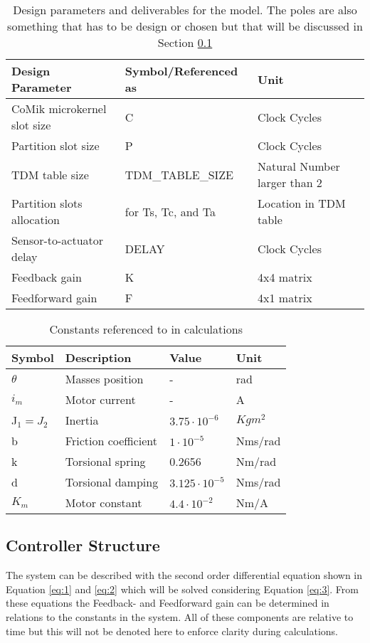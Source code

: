\begin{table}[h!]
	\centering
	\caption{Design parameters and deliverables for the model. The poles are also something that has to be design or chosen but that will be discussed in Section \ref{sec:controllerstructure}}
	\begin{tabular}{lll}
		\toprule
		Design Parameter & Symbol/Referenced as &Unit\\
		\midrule
		CoMik microkernel slot size& C & Clock Cycles \\
		Partition slot size& P & Clock Cycles\\
		TDM table size& TDM\_TABLE\_SIZE & Natural Number larger than 2\\
		Partition slots allocation	& for Ts, Tc, and Ta & Location in TDM table \\
		Sensor-to-actuator	delay& DELAY & Clock Cycles	\\
		Feedback gain& K & 4x4 matrix \\
		Feedforward gain& F & 4x1 matrix \\
		\midrule		
	\end{tabular}
	\label{tab:design}
\end{table}

\begin{table}[htbp]
	\centering
	\caption{Constants referenced to in calculations}
	\begin{tabular}{llll}
		\toprule
		Symbol & Description & Value & Unit\\ 
		\midrule
		$\theta$ & Masses position  & -&rad \\ 
		$i_m$ & Motor current  & - &A \\ 
		J$_1 = J_2$ & Inertia  & $3.75\cdot10^{-6}$&$Kgm^2$  \\ 
		b & Friction  coefficient   &$ 1\cdot10^{-5} $&Nms/rad\\ 
		k & Torsional spring  & 0.2656 &Nm/rad\\
		d & Torsional damping  & $3.125\cdot10^{-5}$&Nms/rad \\ 
		$K_m$ & Motor constant  & $4.4\cdot10^{-2}$&Nm/A  \\ 
		\midrule
	\end{tabular}
	\label{tab:constants}
\end{table}

 

\subsection{Controller Structure}
 \label{sec:controllerstructure}
The system can be described with the second order differential equation shown in Equation \ref{eq:1} and \ref{eq:2} which will be solved considering Equation \ref{eq:3}. From these equations the Feedback- and Feedforward gain can be determined in relations to the constants in the system. All of these components are relative to time but this will not be denoted here to enforce clarity during calculations.


